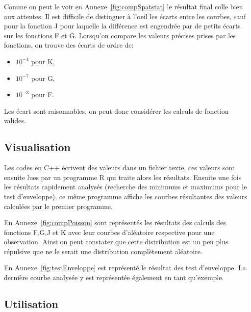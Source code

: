 \documentclass[stage2a]{tnreport}
\begin{document}
Comme on peut le voir en Annexe~\ref{fig:compSpatstat} le résultat final colle bien aux attentes. Il est difficile de distinguer à l'oeil les écarts entre les courbes, sauf pour la fonction J pour laquelle la différence est engendrée par de petits écarts sur les fonctions F et G.
Lorsqu'on compare les valeurs précises prises par les fonctions, on trouve des écarts de ordre de:
\begin{itemize}
\item \begin{math}10^{-4}\end{math} pour K,
\item \begin{math}10^{-7}\end{math} pour G,
\item \begin{math}10^{-3}\end{math} pour F.\\
\end{itemize}

Les écart sont raisonnables, on peut donc considérer les calculs de fonction valides.


\subsection{Visualisation}

Les codes en C++ écrivent des valeurs dans un fichier texte, ces valeurs sont ensuite lues par un programme R qui traite alors les résultats. Ensuite une fois les résultats rapidement analysés (recherche des minimums et maximums pour le test d'enveloppe), ce même programme affiche les courbes résultantes des valeurs calculées par le premier programme.

En Annexe~\ref{fig:compPoisson} sont représentés les résultats des calculs des fonctions F,G,J et K avec leur courbes d'aléatoire respective pour une observation. Ainsi on peut constater que cette distribution est un peu plus répulsive que ne le serait une distribution complètement aléatoire.

En Annexe~\ref{fig:testEnveloppe} est représenté le résultat des test d'enveloppe. La dernière courbe analysée y est représentée également en tant qu'exemple.

\newpage


\subsection{Utilisation}
\end{document}
